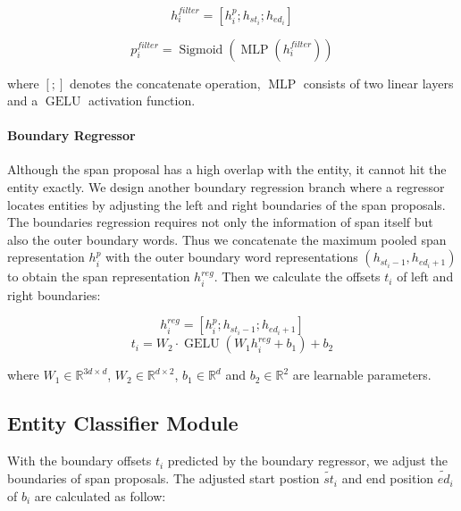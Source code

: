 \documentclass[11pt,a4paper]{article}
\begin{document}
\begin{equation}
    h^{filter}_i = \left[h^p_i;h_{st_i}; h_{ed_i}\right]
\end{equation}

\begin{equation}
    p^{filter}_i = \operatorname{Sigmoid}\left(\operatorname{MLP}\left(h^{filter}_i\right)\right)
\end{equation}

\noindent where $[;]$ denotes the concatenate operation, $\operatorname{MLP}$ consists of two linear layers and a $\operatorname{GELU}$ \citep{DBLP:journals/corr/HendrycksG16} activation function.

\paragraph{Boundary Regressor}

Although the span proposal has a high overlap with the entity, it cannot hit the entity exactly. We design another boundary regression branch where a regressor locates entities by adjusting the left and right boundaries of the span proposals. The boundaries regression requires not only the information of span itself but also the outer boundary words. Thus we concatenate the maximum pooled span representation $h^p_i$ with the outer boundary word representations $(h_{st_i-1}, h_{ed_i+1})$ to obtain the span representation $h^{reg}_i$. Then we calculate the offsets $t_i$ of left and right boundaries:

\begin{equation}
    h^{reg}_i = \left[h^p_i;h_{st_i-1}; h_{ed_i+1}\right]
\end{equation}
\begin{equation}
    t_i =W_2\cdot \operatorname{GELU}(W_1h^{reg}_i+ b_1)+b_2
\end{equation}

\noindent where $W_1\in \mathbb{R}^{3d\times d}$, $W_2\in \mathbb{R}^{d\times2}$, $b_1\in \mathbb{R}^d$ and $b_2 \in \mathbb{R}^2$ are learnable parameters.


\subsection{Entity Classifier Module}

With the boundary offsets $t_i$ predicted by the boundary regressor, we adjust the boundaries of span proposals. The adjusted start postion $\widetilde{st}_i$ and end position $\widetilde{ed}_i$ of $b_i$ are calculated as follow:
\end{document}
